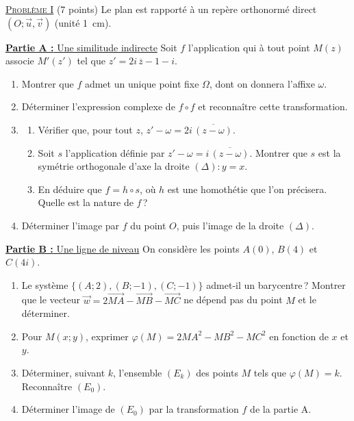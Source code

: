 \noindent \underline{\textsc{Probl\`eme I}} (7 points) \newline
Le plan est rapport\'e \`a un rep\`ere orthonorm\'e direct $(O ; \vec{u}, \vec{v})$ (unit\'e 1~cm).

\underline{\textbf{Partie A :} Une similitude indirecte} \newline
Soit $f$ l'application qui \`a tout point $M(z)$ associe $M'(z')$ tel que $z' = 2i\,\overline{z} - 1 - i$.
\begin{enumerate}
      \item Montrer que $f$ admet un unique point fixe $\Omega$, dont on donnera l'affixe $\omega$.
      \item D\'eterminer l'expression complexe de $f \circ f$ et reconna\^itre cette transformation.
      \item \begin{enumerate}
            \item V\'erifier que, pour tout $z$, $z' - \omega = 2i\,\overline{(z - \omega)}$.
            \item Soit $s$ l'application d\'efinie par $z' - \omega = i\,\overline{(z - \omega)}$. Montrer que $s$ est la sym\'etrie
                  orthogonale d'axe la droite $(\Delta) : y = x$.
            \item En d\'eduire que $f = h \circ s$, o\`u $h$ est une homoth\'etie que l'on pr\'ecisera. Quelle est la nature de $f$\,?
            \end{enumerate}
      \item D\'eterminer l'image par $f$ du point $O$, puis l'image de la droite $(\Delta)$.
\end{enumerate}
\underline{\textbf{Partie B :} Une ligne de niveau} \newline
On consid\`ere les points $A(0)$, $B(4)$ et $C(4i)$.
\begin{enumerate}
      \item Le syst\`eme $\{(A ; 2), (B ; -1), (C ; -1)\}$ admet-il un barycentre\,? Montrer que le vecteur
            $\vec{w} = 2\overrightarrow{MA} - \overrightarrow{MB} - \overrightarrow{MC}$ ne d\'epend pas du point $M$ et le d\'eterminer.
      \item Pour $M(x ; y)$, exprimer $\varphi(M) = 2MA^2 - MB^2 - MC^2$ en fonction de $x$ et $y$.
      \item D\'eterminer, suivant $k$, l'ensemble $(E_k)$ des points $M$ tels que $\varphi(M) = k$. Reconna\^itre $(E_0)$.
      \item D\'eterminer l'image de $(E_0)$ par la transformation $f$ de la partie A.
\end{enumerate}

